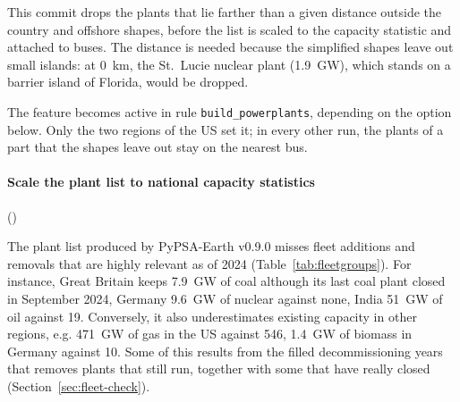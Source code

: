 This commit drops the plants that lie farther than a given distance outside the country and offshore shapes, before the list is scaled to the capacity statistic and attached to buses.
The distance is needed because the simplified shapes leave out small islands: at \SI{0}{km}, the St.~Lucie nuclear plant (\SI{1.9}{GW}), which stands on a barrier island of Florida, would be dropped.

The feature becomes active in rule \texttt{build\_powerplants}, depending on the option below.
Only the two regions of the US set it; in every other run, the plants of a part that the shapes leave out stay on the nearest bus.

\paragraph{Scale the plant list to national capacity statistics} ()

The plant list produced by PyPSA-Earth v0.9.0 misses fleet additions and removals that are highly relevant as of 2024 (Table~\ref{tab:fleetgroups}).
For instance, Great Britain keeps \SI{7.9}{GW} of coal although its last coal plant closed in September 2024, Germany \SI{9.6}{GW} of nuclear against none, India \SI{51}{GW} of oil against 19.
Conversely, it also underestimates existing capacity in other regions, e.g. \SI{471}{GW} of gas in the US against 546, \SI{1.4}{GW} of biomass in Germany against 10.
Some of this results from the filled decommissioning years that removes plants that still run, together with some that have really closed (Section~\ref{sec:fleet-check}).

\begin{table}[htb]
  \centering\small
  \caption{Capacity per fuel group in GW: the plant list of PyPSA-Earth v0.9.0 after the filter of the standard procedure $\to$ the capacity statistic it is scaled to.
  Hydropower is scaled in the same way and described in Section~\ref{sec:hydro}.
  NW Europe: the twelve countries of the region.}
  \label{tab:fleetgroups}
  
\end{table}

